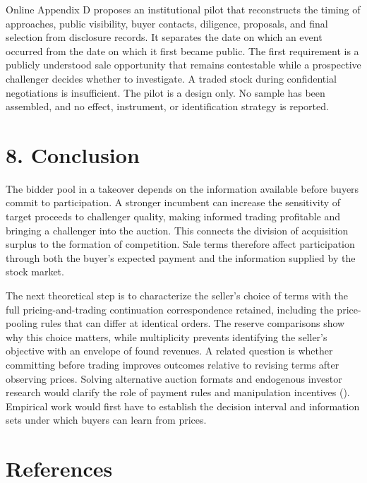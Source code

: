 \documentclass[
  12pt,
]{article}
\begin{document}
Online Appendix D proposes an institutional pilot that reconstructs the
timing of approaches, public visibility, buyer contacts, diligence,
proposals, and final selection from disclosure records. It separates the
date on which an event occurred from the date on which it first became
public. The first requirement is a publicly understood sale opportunity
that remains contestable while a prospective challenger decides whether
to investigate. A traded stock during confidential negotiations is
insufficient. The pilot is a design only. No sample has been assembled,
and no effect, instrument, or identification strategy is reported.

\section{8. Conclusion}\label{sec-conclusion}

The bidder pool in a takeover depends on the information available
before buyers commit to participation. A stronger incumbent can increase
the sensitivity of target proceeds to challenger quality, making
informed trading profitable and bringing a challenger into the auction.
This connects the division of acquisition surplus to the formation of
competition. Sale terms therefore affect participation through both the
buyer's expected payment and the information supplied by the stock
market.

The next theoretical step is to characterize the seller's choice of
terms with the full pricing-and-trading continuation correspondence
retained, including the price-pooling rules that can differ at identical
orders. The reserve comparisons show why this choice matters, while
multiplicity prevents identifying the seller's objective with an
envelope of found revenues. A related question is whether committing
before trading improves outcomes relative to revising terms after
observing prices. Solving alternative auction formats and endogenous
investor research would clarify the role of payment rules and
manipulation incentives (). Empirical work would first have to establish the
decision interval and information sets under which buyers can learn from
prices.

\clearpage

\section{References}\label{references}
\end{document}
